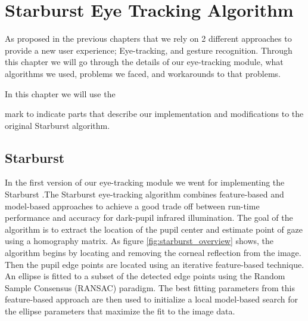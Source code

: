 \chapter{Starburst Eye Tracking Algorithm}
\label{ch_starburst}
As proposed in the previous chapters that we rely on 2 different approaches to provide a new user experience; Eye-tracking, and gesture recognition. Through this chapter we will go through the details of our eye-tracking module, what algorithms we used, problems we faced, and workarounds to that problems.

\begin{eBox}
In this chapter we will use the \: \:   \: \: mark to indicate parts that describe our implementation and modifications to the original Starburst algorithm.
\end{eBox}

\section{Starburst}
In the first version of our eye-tracking module we went for implementing the Starburst \cite{starburst}.The Starburst eye-tracking algorithm combines feature-based and model-based approaches to achieve a good trade off between run-time performance and accuracy for dark-pupil infrared illumination. The goal of the algorithm is to extract the location of the pupil center and estimate point of gaze using a homography matrix. As figure \ref{fig:starburst_overview} shows, the algorithm begins by locating and removing the corneal reflection from the image. Then the pupil edge points are located using an iterative feature-based technique. An ellipse is fitted to a subset of the detected edge points using the Random Sample Consensus (RANSAC) paradigm. The best fitting parameters from this feature-based approach are then used to initialize a local model-based search for the ellipse  parameters that maximize the fit to the image data.


